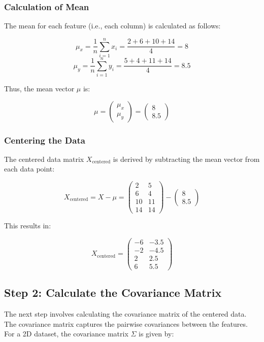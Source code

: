 \documentclass{exam}
\begin{document}
\subsubsection*{Calculation of Mean}

The mean for each feature (i.e., each column) is calculated as follows:

\[
\mu_x = \frac{1}{n} \sum_{i=1}^n x_i = \frac{2 + 6 + 10 + 14}{4} = 8
\]
\[
\mu_y = \frac{1}{n} \sum_{i=1}^n y_i = \frac{5 + 4 + 11 + 14}{4} = 8.5
\]

Thus, the mean vector \( \mu \) is:

\[
\mu = \begin{pmatrix} \mu_x \\ \mu_y \end{pmatrix} = \begin{pmatrix} 8 \\ 8.5 \end{pmatrix}
\]

\subsubsection*{Centering the Data}

The centered data matrix \( X_{\text{centered}} \) is derived by subtracting the mean vector from each data point:

\[
X_{\text{centered}} = X - \mu = \begin{pmatrix} 2 & 5 \\ 6 & 4 \\ 10 & 11 \\ 14 & 14 \end{pmatrix} - \begin{pmatrix} 8 \\ 8.5 \end{pmatrix}
\]

This results in:

\[
X_{\text{centered}} = \begin{pmatrix} -6 & -3.5 \\ -2 & -4.5 \\ 2 & 2.5 \\ 6 & 5.5 \end{pmatrix}
\]

\subsection{Step 2: Calculate the Covariance Matrix}

The next step involves calculating the covariance matrix of the centered data. The covariance matrix captures the pairwise covariances between the features. For a 2D dataset, the covariance matrix \( \Sigma \) is given by:
\end{document}
